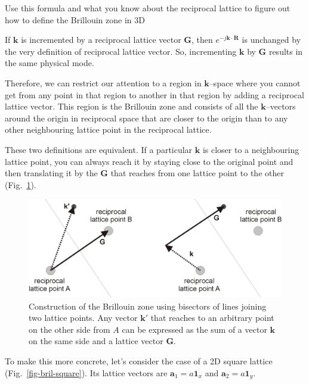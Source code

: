 \begin{cue}
  Use this formula and what you know about the reciprocal lattice to figure out how to define the Brillouin zone in 3D
\end{cue}

If ${\mathbf k}$ is incremented by a reciprocal lattice vector ${\mathbf G}$, then $e^{-j {\mathbf k} \cdot {\mathbf R}}$ is unchanged by the very definition of reciprocal lattice vector. So, incrementing ${\mathbf k}$ by ${\mathbf G}$ results in the same physical mode.

Therefore, we can restrict our attention to a region in ${\mathbf k}$--space where you cannot get from any point in that region to another in that region by adding a reciprocal lattice vector. This region is the Brillouin zone and consists of all the ${\mathbf k}$--vectors around the origin in reciprocal space that are closer to the origin than to any other neighbouring lattice point in the reciprocal lattice.

These two definitions are equivalent. If a particular ${\mathbf k}$ is closer to a neighbouring lattice point, you can always reach it by staying close to the original point and then translating it by the ${\mathbf G}$ that reaches from one lattice point to the other (Fig.~\ref{fig-bril-bisector}).

\begin{figure}[H]
\centering
\includegraphics{symmetry/figures/bisector}
\caption{Construction of the Brillouin zone using bisectors of lines joining two lattice points. Any vector ${\mathbf k}'$ that reaches to an arbitrary point on the other side from $A$ can be expressed as the sum of a vector ${\mathbf k}$ on the same side and a lattice vector ${\mathbf G}$.}
\label{fig-bril-bisector}
\end{figure}

To make this more concrete, let's consider the case of a 2D square lattice (Fig.~\ref{fig-bril-square}). Its lattice vectors are ${\mathbf a}_1 = a {\mathbf 1}_x$ and ${\mathbf a}_2 = a {\mathbf 1}_y$.

